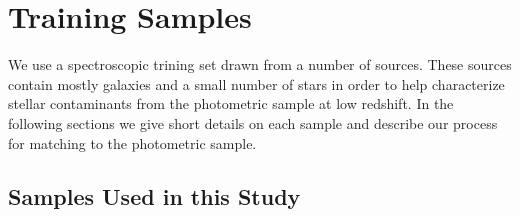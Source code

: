 \documentclass[preprint]{aastex}
\begin{document}
\section{Training Samples} \label{sec:train}

We use a spectroscopic trining set drawn from a number of sources. These
sources contain mostly galaxies and a small number of stars in order to help
characterize stellar contaminants from the photometric sample at low redshift.
In the following sections we give short details on each sample and describe our
process for matching to the photometric sample.

\subsection{Samples Used in this Study} \label{sec:train:def}







\end{document}
